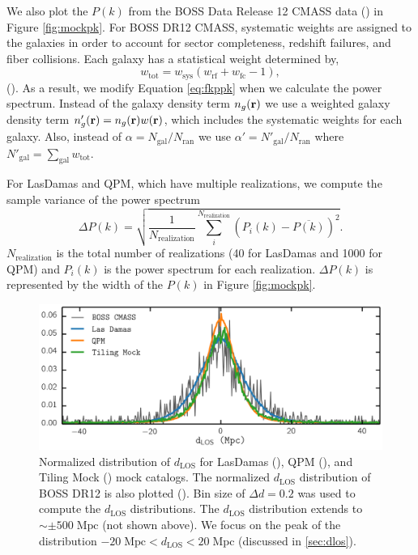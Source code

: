 \documentclass{emulateapj}
\begin{document}
We also plot the $P(k)$ from the BOSS Data Release 12 CMASS data (\cmasscolor) in Figure \ref{fig:mockpk}. For BOSS DR12 CMASS, systematic weights are assigned to the galaxies in order to account for sector completeness, redshift failures, and fiber collisions. Each galaxy has a statistical weight determined by, 
\begin{equation} \label{eq:weight}
w_\mathrm{tot} = w_\mathrm{sys} (w_\mathrm{rf} + w_\mathrm{fc} -1), 
\end{equation} 
(\citealt{Anderson:2012aa, Beutler:2014aa}). As a result, we modify Equation \ref{eq:fkppk} when we calculate the power spectrum. Instead of the galaxy density term $n_g({\bf r})$ we use a weighted galaxy density term $n'_g({\bf r}) = n_g({\bf r}) w({\bf r})$, which includes the systematic weights for each galaxy. Also, instead of $\alpha = N_{\mathrm{gal}}/N_\mathrm{ran}$ we use $\alpha ' = N'_\mathrm{gal}/N_\mathrm{ran}$ where $N'_\mathrm{gal} = \sum_\mathrm{gal} w_\mathrm{tot}$. 

For LasDamas and QPM, which have multiple realizations, we compute the sample variance of the power spectrum
\begin{equation} \label{eq:pk_var}
\Delta P (k)= \sqrt{\frac{1}{N_\mathrm{realization}} \sum\limits_i^{N_\mathrm{realization}} (P_i(k)- \overline{P(k)})^2 }. 
\end{equation}
$N_\mathrm{realization}$ is the total number of realizations (40 for LasDamas and 1000 for QPM) and $P_i(k)$ is the power spectrum for each realization. $\Delta P(k)$ is represented by the width of the $P(k)$ in Figure \ref{fig:mockpk}. 

\begin{figure}
\begin{center}
\includegraphics[scale=0.575]{fcpaper_dlos_dist.png}
\caption{Normalized distribution of $d_{\mathrm{LOS}}$ for LasDamas (\ldgcolor), QPM (\qpmcolor), and Tiling Mock (\tmcolor) mock catalogs. The normalized $d_{\mathrm{LOS}}$ distribution of BOSS DR12 is also plotted (\cmasscolor). Bin size of $\Delta d = 0.2$ was used to compute the $d_{\mathrm{LOS}}$ distributions. The $d_\mathrm{LOS}$ distribution extends to $\sim \pm 500 \; \mathrm{Mpc}$ (not shown above). We focus on the peak of the distribution $-20 \; \mathrm{Mpc} < d_\mathrm{LOS} < 20 \;\mathrm{Mpc}$ (discussed in \ref{sec:dlos}).} \label{fig:d_los}
\end{center}
\end{figure}
\end{document}
